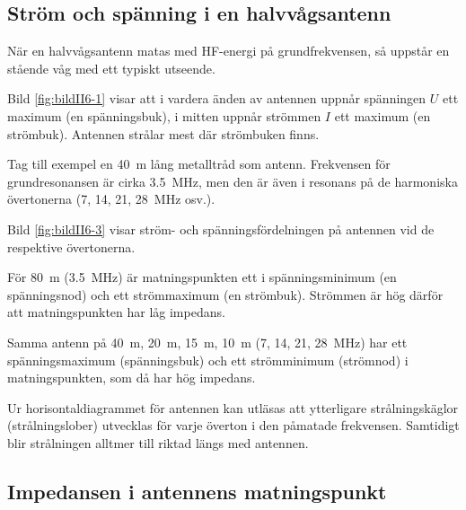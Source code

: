 \subsection{Ström och spänning i en halvvågs\-antenn}


När en halvvågsantenn matas med HF-energi på grundfrekvensen, så uppstår en
stående våg med ett typiskt utseende.

Bild \ref{fig:bildII6-1} visar att i vardera änden av antennen uppnår spänningen
\(U\) ett maximum (en spänningsbuk), i mitten uppnår strömmen \(I\)
ett maximum (en strömbuk).
Antennen strålar mest där strömbuken finns.

Tag till exempel en \SI{40}{\metre} lång metalltråd som antenn.
Frekvensen för grundresonansen är cirka \SI{3,5}{\mega\hertz}, men den är även i
resonans på de harmoniska övertonerna (7, 14, 21, \SI{28}{\mega\hertz} osv.).

Bild \ref{fig:bildII6-3} visar ström- och spänningsfördelningen på antennen vid
de respektive övertonerna.

För \SI{80}{\metre} (\SI{3,5}{\mega\hertz}) är matningspunkten ett i
spänningsminimum (en spänningsnod) och ett strömmaximum (en strömbuk).
Strömmen är hög därför att matningspunkten har låg impedans.

Samma antenn på \SI{40}{\metre}, \SI{20}{\metre}, \SI{15}{\metre},
\SI{10}{\metre} (7, 14, 21, 28~MHz) har ett spänningsmaximum (spänningsbuk) och
ett strömminimum (strömnod) i matningspunkten, som då har hög impedans.

Ur horisontaldiagrammet för antennen kan utläsas att ytterligare
strålningskäglor (strålningslober) utvecklas för varje överton i den
påmatade frekvensen.
Samtidigt blir strålningen alltmer till riktad längs med antennen.

\subsection{Impedansen i antennens matningspunkt}


